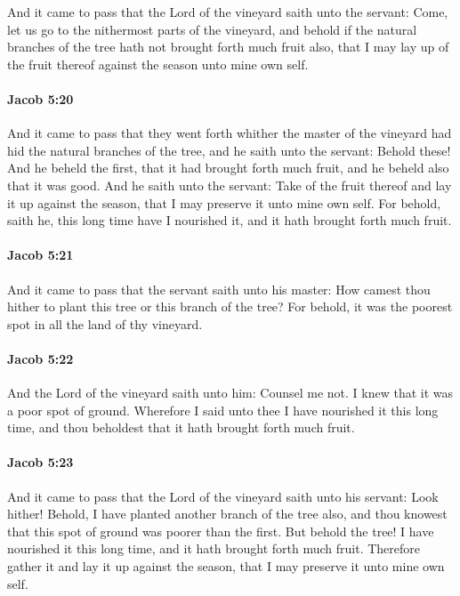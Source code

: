 			And it came to pass that the Lord of the vineyard saith unto the servant:
			Come, let us go to the nithermost parts of the vineyard,
			and behold if the natural branches of the tree
			hath not brought forth much fruit also,
			that I may lay up of the fruit thereof against the season unto mine own self.

		\paragraph{Jacob 5:20} %
			\label{JACOB-5-20}

			And it came to pass that they went forth
			whither the master of the vineyard had hid the natural branches of the tree,
			and he saith unto the servant:
			Behold these!
			And he beheld the first, that it had brought forth much fruit,
			and he beheld also that it was good.
			And he saith unto the servant:
			Take of the fruit thereof and lay it up against the season,
			that I may preserve it unto mine own self.
			For behold, saith he, this long time have I nourished it,
			and it hath brought forth much fruit.

		\paragraph{Jacob 5:21} %
			\label{JACOB-5-21}

			And it came to pass that the servant saith unto his master:
			How camest thou hither to plant this tree or this branch of the tree?
			For behold, it was the poorest spot in all the land of thy vineyard.

		\paragraph{Jacob 5:22} %
			\label{JACOB-5-22}

			And the Lord of the vineyard saith unto him:
			Counsel me not.
			I knew that it was a poor spot of ground.
			Wherefore I said unto thee I have nourished it this long time,
			and thou beholdest that it hath brought forth much fruit.

		\paragraph{Jacob 5:23} %
			\label{JACOB-5-23}

			And it came to pass that the Lord of the vineyard saith unto his servant:
			Look hither! Behold, I have planted another branch of the tree also,
			and thou knowest that this spot of ground was poorer than the first.
			But behold the tree!
			I have nourished it this long time,
			and it hath brought forth much fruit.
			Therefore gather it and lay it up against the season,
			that I may preserve it unto mine own self.

